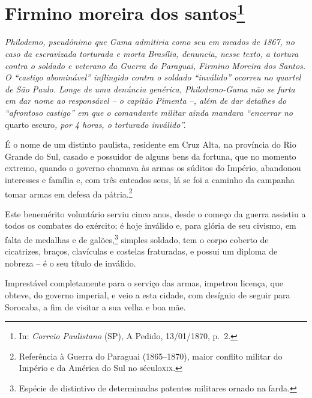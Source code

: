 \chapter{Firmino moreira dos santos\footnote{ In: \emph{Correio Paulistano} (SP), A Pedido, 13/01/1870,
  p.~2.}} %

\begin{didascalia}
\emph{Philodemo, pseudônimo que Gama admitiria como seu em meados de
1867, no caso da escravizada torturada e morta Brasília, denuncia, nesse
texto, a tortura contra o soldado e veterano da Guerra do Paraguai,
Firmino Moreira dos Santos. O ``castigo abominável'' inflingido contra o
soldado ``inválido'' ocorreu no quartel de São Paulo. Longe de uma
denúncia genérica, Philodemo-Gama não se furta em dar nome ao
responsável -- o capitão Pimenta --, além de dar detalhes do ``afrontoso
castigo'' em que o comandante militar ainda mandara ``encerrar no} quarto
escuro\emph{, por 4 horas, o torturado inválido''.}
\end{didascalia}

\asterisc{}

É o nome de um distinto paulista, residente em Cruz Alta, na província
do Rio Grande do Sul, casado e possuidor de alguns bens da fortuna, que
no momento extremo, quando o governo chamava às armas os súditos do
Império, abandonou interesses e família e, com três enteados seus, lá se
foi a caminho da campanha tomar armas em defesa da pátria.\footnote{
  Referência à Guerra do Paraguai (1865--1870), maior conflito militar do
  Império e da América do Sul no século\textsc{xix}.}

Este benemérito voluntário serviu cinco anos, desde o começo da guerra
assistiu a todos os combates do exército; é hoje inválido e, para glória
de seu civismo, em falta de medalhas e de galões,\footnote{ Espécie
  de distintivo de determinadas patentes militares ornado na farda.}
simples soldado, tem o corpo coberto de cicatrizes, braços, clavículas e
costelas fraturadas, e possui um diploma de nobreza -- é o seu título de
inválido.

Imprestável completamente para o serviço das armas, impetrou licença,
que obteve, do governo imperial, e veio a esta cidade, com desígnio de
seguir para Sorocaba, a fim de visitar a sua velha e boa mãe.


